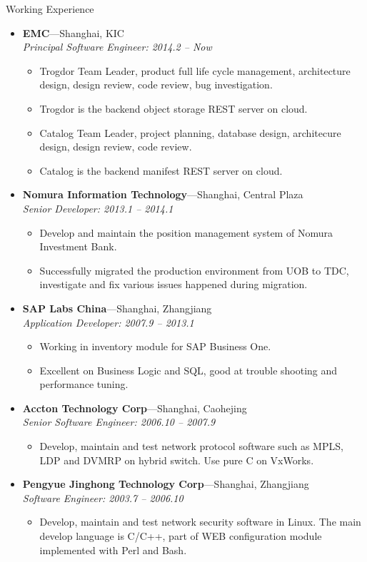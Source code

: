 \documentclass[11pt,oneside]{article}
\newenvironment{ressection}[1]{
	\vspace{4pt}
	{\selectfont\Large#1}
	\begin{itemize}
	\vspace{3pt}
}{
	\end{itemize}
}
\newcommand{\ressubitem}[1]{
	\vspace{-1pt}
	\item \begin{flushleft} #1 \end{flushleft}
}
\newcommand{\resbigitem}[3]{
	\vspace{-5pt}
	\item
	\textbf{#1}---#2 \\
	\textit{#3}
}
\newenvironment{ressubsec}[3]{
	\resbigitem{#1}{#2}{#3}
	\vspace{-2pt}
	\begin{itemize}
}{
    \end{itemize}
}
\begin{document}
\begin{ressection}{Working Experience}

	\begin{ressubsec}{EMC}{Shanghai, KIC}{Principal Software Engineer: 2014.2 -- Now}
		\ressubitem{Trogdor Team Leader, product full life cycle management, architecture design,
					design review, code review, bug investigation.}
		\ressubitem{Trogdor is the backend object storage REST server on cloud.}
		\ressubitem{Catalog Team Leader, project planning, database design, architecure design,
					design review, code review.}
		\ressubitem{Catalog is the backend manifest REST server on cloud.}
	\end{ressubsec}

	\begin{ressubsec}{Nomura Information Technology}{Shanghai, Central Plaza}{Senior Developer: 2013.1 -- 2014.1}
		\ressubitem{Develop and maintain the position management system of Nomura Investment Bank.}
		\ressubitem{Successfully migrated the production environment from UOB to TDC, investigate and
					fix various issues happened during migration.}
	\end{ressubsec}

	\begin{ressubsec}{SAP Labs China}{Shanghai, Zhangjiang}{Application Developer: 2007.9 -- 2013.1}
		\ressubitem{Working in inventory module for SAP Business One.}
		\ressubitem{Excellent on Business Logic and SQL, good at trouble shooting and performance tuning.}
	\end{ressubsec}

	\begin{ressubsec}{Accton Technology Corp}{Shanghai, Caohejing}{Senior Software Engineer: 2006.10 -- 2007.9}
		\ressubitem{Develop, maintain and test network protocol software such as MPLS, LDP and DVMRP on
					hybrid switch. Use pure C on VxWorks.}
	\end{ressubsec}

	\begin{ressubsec}{Pengyue Jinghong Technology Corp}{Shanghai, Zhangjiang}{Software Engineer: 2003.7 -- 2006.10}
		\ressubitem{Develop, maintain and test network security software in Linux. The main develop
					language is C/C++, part of WEB configuration module implemented with Perl and
					Bash.}
	\end{ressubsec}

\end{ressection}
\end{document}

